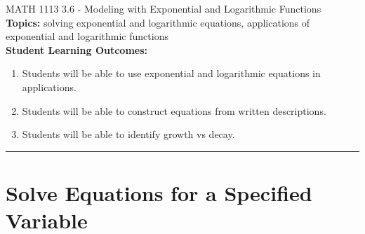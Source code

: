 \documentclass[11pt]{article}
\begin{document}
\noindent MATH 1113   \hfill 3.6 - Modeling with Exponential and Logarithmic Functions\\



\noindent \textbf{Topics:}  solving exponential and logarithmic equations, applications of exponential and logarithmic functions\\

\noindent \textbf{Student Learning Outcomes:}
\begin{enumerate}
\item Students will be able to use exponential and logarithmic equations in applications.
\item Students will be able to construct equations from written descriptions.
\item Students will be able to identify growth vs decay.
\end{enumerate}

\hrule 
\vspace{5mm}
\section{Solve Equations for a Specified Variable}
\end{document}
